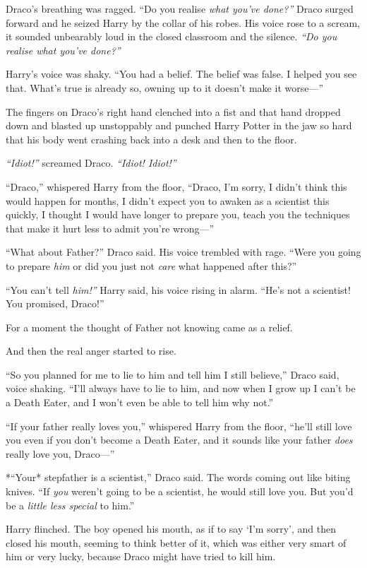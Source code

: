 Draco's breathing was ragged. ``Do you realise \emph{what you've
done?''} Draco surged forward and he seized Harry by the collar of his
robes. His voice rose to a scream, it sounded unbearably loud in the
closed classroom and the silence. \emph{``Do you realise what you've
done?''}

Harry's voice was shaky. ``You had a belief. The belief was false. I
helped you see that. What's true is already so, owning up to it doesn't
make it worse---''

The fingers on Draco's right hand clenched into a fist and that hand
dropped down and blasted up unstoppably and punched Harry Potter in the
jaw so hard that his body went crashing back into a desk and then to the
floor.

\emph{``Idiot!''} screamed Draco. \emph{``Idiot! Idiot!''}

``Draco,'' whispered Harry from the floor, ``Draco, I'm sorry, I didn't
think this would happen for months, I didn't expect you to awaken as a
scientist this quickly, I thought I would have longer to prepare you,
teach you the techniques that make it hurt less to admit you're
wrong---''

``What about Father?'' Draco said. His voice trembled with rage. ``Were
you going to prepare \emph{him} or did you just not \emph{care} what
happened after this?''

``You can't tell \emph{him!''} Harry said, his voice rising in alarm.
``He's not a scientist! You promised, Draco!''

For a moment the thought of Father not knowing came as a relief.

And then the real anger started to rise.

``So you planned for me to lie to him and tell him I still believe,''
Draco said, voice shaking. ``I'll always have to lie to him, and now
when I grow up I can't be a Death Eater, and I won't even be able to
tell him why not.''

``If your father really loves you,'' whispered Harry from the floor,
``he'll still love you even if you don't become a Death Eater, and it
sounds like your father \emph{does} really love you, Draco---''

*``Your* stepfather is a scientist,'' Draco said. The words coming out
like biting knives. ``If \emph{you} weren't going to be a scientist, he
would still love you. But you'd be a \emph{little less special} to
him.''

Harry flinched. The boy opened his mouth, as if to say `I'm sorry', and
then closed his mouth, seeming to think better of it, which was either
very smart of him or very lucky, because Draco might have tried to kill
him.


